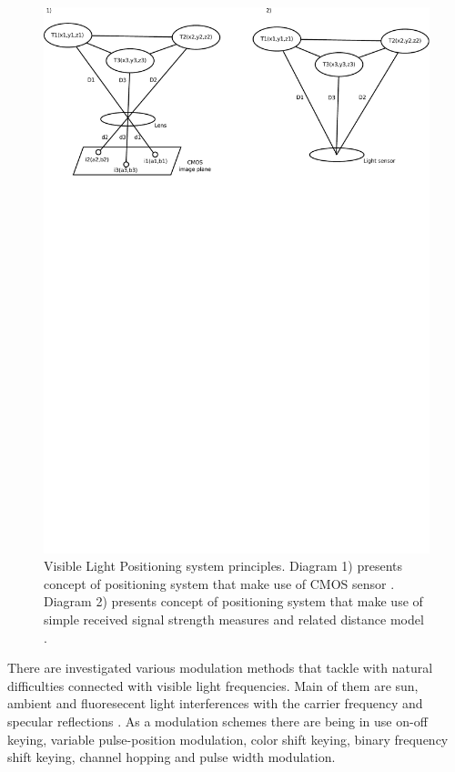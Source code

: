 \documentclass[../main.tex]{subfiles}
\begin{document}
\begin{figure}[!htbp]
\includegraphics[width=\textwidth, trim={0 20cm 0 0},clip]{pictures/visible_positioning.pdf}
\centering
\caption{Visible Light Positioning system principles. Diagram 1) presents concept of positioning system that make use of CMOS sensor  \cite{visible_light_positioning}. Diagram 2) presents concept of positioning system that make use of simple received signal strength measures and related distance model \cite{visible_light_positioning_epsilon}.}
\label{fig:visible_positioning}
\end{figure}

There are investigated various modulation methods that tackle with natural difficulties connected with visible light frequencies. Main of them are sun, ambient and fluoresecent light interferences with the carrier frequency and specular reflections \cite{visible_light_positioning}. As a modulation schemes there are being in use on-off keying, variable pulse-position modulation, color shift keying, binary frequency shift keying, channel hopping and pulse width modulation.
\end{document}
